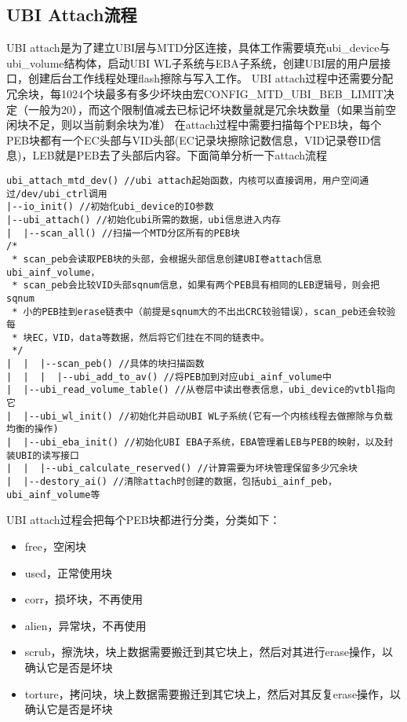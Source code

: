 \subsection{UBI Attach流程}
UBI attach是为了建立UBI层与MTD分区连接，具体工作需要填充ubi\_device与ubi\_volume结构体，启动UBI WL子系统与EBA子系统，创建UBI层的用户层接口，创建后台工作线程处理flash擦除与写入工作。
UBI attach过程中还需要分配冗余块，每1024个块最多有多少坏块由宏CONFIG\_MTD\_UBI\_BEB\_LIMIT决定（一般为20），而这个限制值减去已标记坏块数量就是冗余块数量（如果当前空闲块不足，则以当前剩余块为准）
在attach过程中需要扫描每个PEB块，每个PEB块都有一个EC头部与VID头部(EC记录块擦除记数信息，VID记录卷ID信息)，LEB就是PEB去了头部后内容。下面简单分析一下attach流程
\begin{mdframed}[style=leftredline]
\begin{verbatim}
ubi_attach_mtd_dev() //ubi attach起始函数，内核可以直接调用，用户空间通过/dev/ubi_ctrl调用
|--io_init() //初始化ubi_device的IO参数
|--ubi_attach() //初始化ubi所需的数据，ubi信息进入内存
|  |--scan_all() //扫描一个MTD分区所有的PEB块
/*
 * scan_peb会读取PEB块的头部，会根据头部信息创建UBI卷attach信息ubi_ainf_volume，
 * scan_peb会比较VID头部sqnum信息，如果有两个PEB具有相同的LEB逻辑号，则会把sqnum
 * 小的PEB挂到erase链表中（前提是sqnum大的不出出CRC较验错误），scan_peb还会较验每
 * 块EC，VID，data等数据，然后将它们挂在不同的链表中。
 */
|  |  |--scan_peb() //具体的块扫描函数
|  |  |  |--ubi_add_to_av() //将PEB加到对应ubi_ainf_volume中
|  |--ubi_read_volume_table() //从卷层中读出卷表信息，ubi_device的vtbl指向它
|  |--ubi_wl_init() //初始化并启动UBI WL子系统(它有一个内核线程去做擦除与负载均衡的操作)
|  |--ubi_eba_init() //初始化UBI EBA子系统，EBA管理着LEB与PEB的映射，以及封装UBI的读写接口
|  |  |--ubi_calculate_reserved() //计算需要为坏块管理保留多少冗余块
|  |--destory_ai() //清除attach时创建的数据，包括ubi_ainf_peb，ubi_ainf_volume等
\end{verbatim}
\end{mdframed}
UBI attach过程会把每个PEB块都进行分类，分类如下：
\begin{itemize}
  \item free，空闲块
  \item used，正常使用块
  \item corr，损坏块，不再使用
  \item alien，异常块，不再使用
  \item scrub，擦洗块，块上数据需要搬迁到其它块上，然后对其进行erase操作，以确认它是否是坏块
  \item torture，拷问块，块上数据需要搬迁到其它块上，然后对其反复erase操作，以确认它是否是坏块
\end{itemize}
